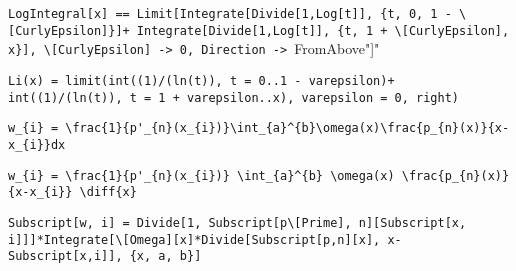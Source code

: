 \newsavebox\AHMM
\begin{lrbox}{\AHMM}
 \begin{minipage}[t]{0.82\textwidth}
  \lstinline[language={[latex]TeX},mathescape,breaklines=true]"LogIntegral[x] == Limit[Integrate[Divide[1,Log[t]], {t, 0, 1 - \[CurlyEpsilon]}]+ Integrate[Divide[1,Log[t]], {t, 1 + \[CurlyEpsilon], x}], \[CurlyEpsilon] -> 0, Direction -> "FromAbove"]"
 \end{minipage}
\end{lrbox}
\newsavebox\AHMA
\begin{lrbox}{\AHMA}
 \begin{minipage}[t]{0.82\textwidth}
  \lstinline[language={[latex]TeX},mathescape,breaklines=true]"Li(x) = limit(int((1)/(ln(t)), t = 0..1 - varepsilon)+ int((1)/(ln(t)), t = 1 + varepsilon..x), varepsilon = 0, right)"
 \end{minipage}
\end{lrbox}
\newsavebox\AIT
\begin{lrbox}{\AIT}
 \begin{minipage}[t]{0.82\textwidth}
  \lstinline[language={[latex]TeX},mathescape,breaklines=true]"w_{i} = \frac{1}{p'_{n}(x_{i})}\int_{a}^{b}\omega(x)\frac{p_{n}(x)}{x-x_{i}}dx"
 \end{minipage}
\end{lrbox}
\newsavebox\AIST
\begin{lrbox}{\AIST}
 \begin{minipage}[t]{0.82\textwidth}
  \lstinline[language={[latex]TeX},mathescape,breaklines=true]"w_{i} = \frac{1}{p'_{n}(x_{i})} \int_{a}^{b} \omega(x) \frac{p_{n}(x)}{x-x_{i}} \diff{x}"
 \end{minipage}
\end{lrbox}
\newsavebox\AIMM
\begin{lrbox}{\AIMM}
 \begin{minipage}[t]{0.82\textwidth}
  \lstinline[language={[latex]TeX},mathescape,breaklines=true]"Subscript[w, i] = Divide[1, Subscript[p\[Prime], n][Subscript[x, i]]]*Integrate[\[Omega][x]*Divide[Subscript[p,n][x], x-Subscript[x,i]], {x, a, b}]"
 \end{minipage}
\end{lrbox}
\newsavebox\AIMA
\begin{lrbox}{\AIMA}
 \begin{minipage}[t]{0.82\textwidth}
  \lstinline[language={[latex]TeX},mathescape,breaklines=true]""
 \end{minipage}
\end{lrbox}
